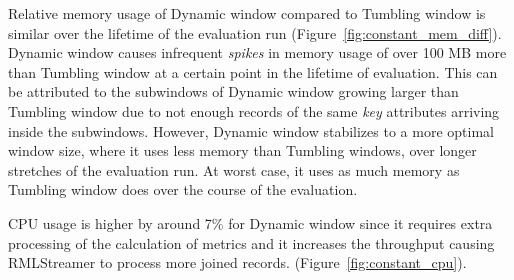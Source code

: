 Relative memory usage of Dynamic window compared to Tumbling window is similar over the lifetime of the 
evaluation run (Figure~\ref{fig:constant_mem_diff}). Dynamic window causes infrequent \emph{spikes} in memory usage of over
 100 MB more than Tumbling window at a certain point in the lifetime of evaluation. This can be attributed 
to the subwindows of Dynamic window growing larger than Tumbling window due to not enough records of the same 
\emph{key} attributes arriving inside the subwindows. However, Dynamic window stabilizes to a more optimal 
window size, where it uses less memory than Tumbling windows, over longer stretches of the evaluation run. At worst case, 
it uses as much memory as Tumbling window does over the course of the evaluation. 

CPU usage is higher by around 7\% for Dynamic window since it requires extra processing of the calculation of metrics and 
it increases the throughput causing RMLStreamer to process more joined records.
(Figure~\ref{fig:constant_cpu}). 

